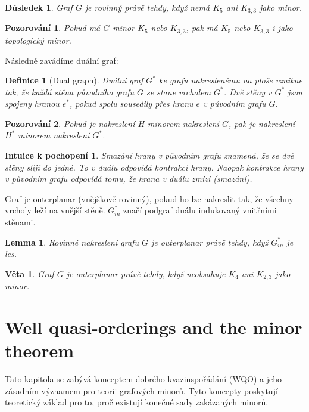 \documentclass[a4paper,11pt]{article}
\newtheorem{definition}{Definice}[section]
\newtheorem{theorem}{Věta}[section]
\newtheorem{lemma}{Lemma}[section]
\newtheorem{corollary}{Důsledek}[section]
\newtheorem{observation}{Pozorování}[section]
\newtheorem*{intuition}{Intuice k pochopení}
\begin{document}
\begin{corollary}
Graf $G$ je rovinný právě tehdy, když nemá $K_5$ ani $K_{3,3}$ jako minor.
\end{corollary}

\begin{observation}
Pokud má $G$ minor $K_5$ nebo $K_{3,3}$, pak má $K_5$ nebo $K_{3,3}$ i jako topologický minor.
\end{observation}

Následně zavádíme duální graf:
\begin{definition}[Dual graph]
Duální graf $G^*$ ke grafu nakreslenému na ploše vznikne tak, že každá stěna původního grafu $G$ se stane vrcholem $G^*$. Dvě stěny v $G^*$ jsou spojeny hranou $e^*$, pokud spolu sousedily přes hranu $e$ v původním grafu $G$.
\end{definition}

\begin{observation}
Pokud je nakreslení $H$ minorem nakreslení $G$, pak je nakreslení $H^*$ minorem nakreslení $G^*$.
\end{observation}

\begin{intuition}
Smazání hrany v původním grafu znamená, že se dvě stěny slijí do jedné. To v duálu odpovídá kontrakci hrany. Naopak kontrakce hrany v původním grafu odpovídá tomu, že hrana v duálu zmizí (smazání).
\end{intuition}

Graf je outerplanar (vnějškově rovinný), pokud ho lze nakreslit tak, že všechny vrcholy leží na vnější stěně. $G^*_{in}$ značí podgraf duálu indukovaný vnitřními stěnami.

\begin{lemma}
Rovinné nakreslení grafu $G$ je outerplanar právě tehdy, když $G^*_{in}$ je les.
\end{lemma}

\begin{theorem}
Graf $G$ je outerplanar právě tehdy, když neobsahuje $K_4$ ani $K_{2,3}$ jako minor.
\end{theorem}

\section{Well quasi-orderings and the minor theorem}

Tato kapitola se zabývá konceptem dobrého kvaziuspořádání (WQO) a jeho zásadním významem pro teorii grafových minorů. Tyto koncepty poskytují teoretický základ pro to, proč existují konečné sady zakázaných minorů.
\end{document}
